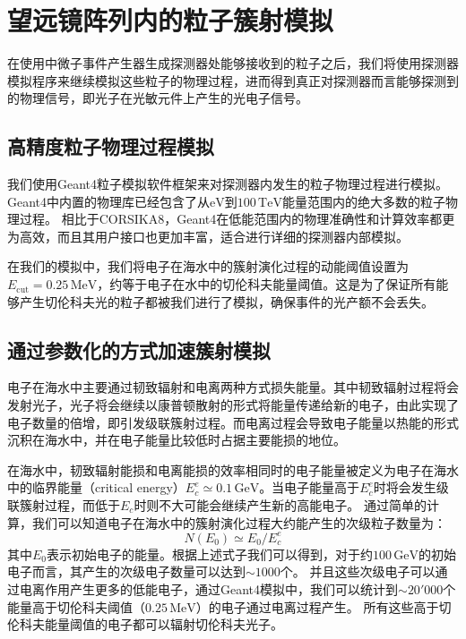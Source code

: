 \section{望远镜阵列内的粒子簇射模拟}
\label{sec:shower_simulation}

在使用中微子事件产生器生成探测器处能够接收到的粒子之后，我们将使用探测器模拟程序来继续模拟这些粒子的物理过程，进而得到真正对探测器而言能够探测到的物理信号，即光子在光敏元件上产生的光电子信号。

\subsection{高精度粒子物理过程模拟}

我们使用\textsf{Geant4}粒子模拟软件框架\cite{GEANT4:2003,GEANT4:2006}来对探测器内发生的粒子物理过程进行模拟。
\textsf{Geant4}中内置的物理库已经包含了从$\mathrm{eV}$到$100\,\mathrm{TeV}$能量范围内的绝大多数的粒子物理过程。
相比于\textsf{CORSIKA8}，\textsf{Geant4}在低能范围内的物理准确性和计算效率都更为高效，而且其用户接口也更加丰富，适合进行详细的探测器内部模拟。

在我们的模拟中，我们将电子在海水中的簇射演化过程的动能阈值设置为$E_\mathrm{cut} = 0.25\,\mathrm{MeV}$，约等于电子在水中的切伦科夫能量阈值。这是为了保证所有能够产生切伦科夫光的粒子都被我们进行了模拟，确保事件的光产额不会丢失。


\subsection{通过参数化的方式加速簇射模拟}

电子在海水中主要通过韧致辐射和电离两种方式损失能量。其中韧致辐射过程将会发射光子，光子将会继续以康普顿散射的形式将能量传递给新的电子，由此实现了电子数量的倍增，即引发级联簇射过程。而电离过程会导致电子能量以热能的形式沉积在海水中，并在电子能量比较低时占据主要能损的地位。

在海水中，韧致辐射能损和电离能损的效率相同时的电子能量被定义为电子在海水中的临界能量（critical energy）\cite{PROPOSAL:2013}$E_c^e \simeq 0.1 \,\mathrm{GeV}$。当电子能量高于$E_c^e$时将会发生级联簇射过程，而低于$E_c$时则不大可能会继续产生新的高能电子。
通过简单的计算，我们可以知道电子在海水中的簇射演化过程大约能产生的次级粒子数量为：
\begin{equation}
    N(E_0) \simeq E_0 / E_c^e
    \label{eq:param_flow_chart}
\end{equation}
其中$E_0$表示初始电子的能量。根据上述式子我们可以得到，对于约$100\,\mathrm{GeV}$的初始电子而言，其产生的次级电子数量可以达到$\sim 1000$个。
并且这些次级电子可以通过电离作用产生更多的低能电子，通过Geant4模拟中，我们可以统计到$\sim 20'000$个能量高于切伦科夫阈值（$0.25\,\mathrm{MeV}$）的电子通过电离过程产生。
所有这些高于切伦科夫能量阈值的电子都可以辐射切伦科夫光子。

